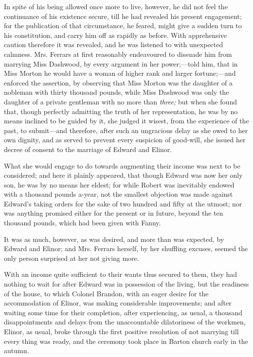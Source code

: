 In spite of his being allowed once more to live, however, he did not feel the continuance of his existence secure, till he had revealed his present engagement; for the publication of that circumstance, he feared, might give a sudden turn to his constitution, and carry him off as rapidly as before. With apprehensive caution therefore it was revealed, and he was listened to with unexpected calmness. Mrs. Ferrars at first reasonably endeavoured to dissuade him from marrying Miss Dashwood, by every argument in her power;---told him, that in Miss Morton he would have a woman of higher rank and larger fortune;---and enforced the assertion, by observing that Miss Morton was the daughter of a nobleman with thirty thousand pounds, while Miss Dashwood was only the daughter of a private gentleman with no more than {\em three;} but when she found that, though perfectly admitting the truth of her representation, he was by no means inclined to be guided by it, she judged it wisest, from the experience of the past, to submit---and therefore, after such an ungracious delay as she owed to her own dignity, and as served to prevent every suspicion of good-will, she issued her decree of consent to the marriage of Edward and Elinor.

What she would engage to do towards augmenting their income was next to be considered; and here it plainly appeared, that though Edward was now her only son, he was by no means her eldest; for while Robert was inevitably endowed with a thousand pounds a-year, not the smallest objection was made against Edward's taking orders for the sake of two hundred and fifty at the utmost; nor was anything promised either for the present or in future, beyond the ten thousand pounds, which had been given with Fanny.

It was as much, however, as was desired, and more than was expected, by Edward and Elinor; and Mrs. Ferrars herself, by her shuffling excuses, seemed the only person surprised at her not giving more.

With an income quite sufficient to their wants thus secured to them, they had nothing to wait for after Edward was in possession of the living, but the readiness of the house, to which Colonel Brandon, with an eager desire for the accommodation of Elinor, was making considerable improvements; and after waiting some time for their completion, after experiencing, as usual, a thousand disappointments and delays from the unaccountable dilatoriness of the workmen, Elinor, as usual, broke through the first positive resolution of not marrying till every thing was ready, and the ceremony took place in Barton church early in the autumn.

